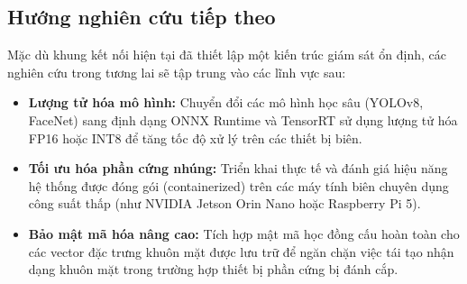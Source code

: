 \documentclass[12pt,a4paper]{article}
\begin{document}
\subsection{Hướng nghiên cứu tiếp theo}
Mặc dù khung kết nối hiện tại đã thiết lập một kiến trúc giám sát ổn định, các nghiên cứu trong tương lai sẽ tập trung vào các lĩnh vực sau:
\begin{itemize}
    \item \textbf{Lượng tử hóa mô hình:} Chuyển đổi các mô hình học sâu (YOLOv8, FaceNet) sang định dạng ONNX Runtime và TensorRT sử dụng lượng tử hóa FP16 hoặc INT8 để tăng tốc độ xử lý trên các thiết bị biên.
    \item \textbf{Tối ưu hóa phần cứng nhúng:} Triển khai thực tế và đánh giá hiệu năng hệ thống được đóng gói (containerized) trên các máy tính biên chuyên dụng công suất thấp (như NVIDIA Jetson Orin Nano hoặc Raspberry Pi 5).
    \item \textbf{Bảo mật mã hóa nâng cao:} Tích hợp mật mã học đồng cấu hoàn toàn cho các vector đặc trưng khuôn mặt được lưu trữ để ngăn chặn việc tái tạo nhận dạng khuôn mặt trong trường hợp thiết bị phần cứng bị đánh cắp.
\end{itemize}

\newpage

\printbibliography
\end{document}
